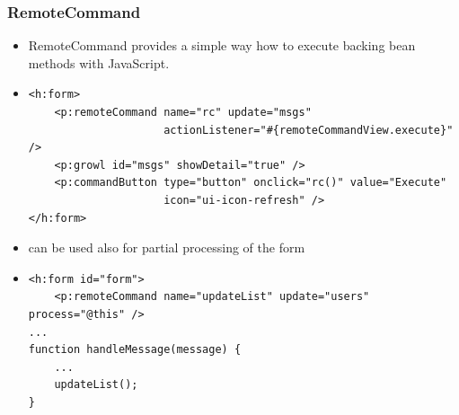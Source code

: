 \documentclass[10pt,xcolor=pdflatex]{beamer}
\begin{document}
\begin{frame}[containsverbatim]\frametitle{RemoteCommand}
  \begin{itemize}
    \item RemoteCommand provides a simple way how to execute backing bean methods with JavaScript.
    \item[] \begin{footnotesize} \begin{verbatim}
<h:form>
    <p:remoteCommand name="rc" update="msgs" 
                     actionListener="#{remoteCommandView.execute}" />
    <p:growl id="msgs" showDetail="true" />
    <p:commandButton type="button" onclick="rc()" value="Execute" 
                     icon="ui-icon-refresh" />
</h:form>
\end{verbatim} \end{footnotesize}
     \item can be used also for partial processing of the form
     \item[] \begin{footnotesize} \begin{verbatim}
<h:form id="form">
    <p:remoteCommand name="updateList" update="users" process="@this" />
...
function handleMessage(message) {
    ...
    updateList();
}
\end{verbatim} \end{footnotesize}
  \end{itemize}
\end{frame}
\end{document}
